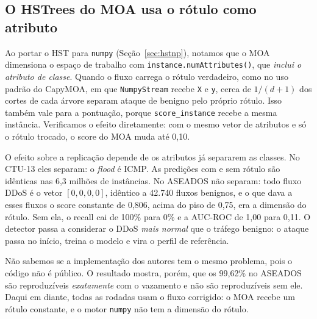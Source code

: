 \subsection{O HSTrees do MOA usa o rótulo como atributo}
\label{sec:leak}
Ao portar o HST para \texttt{numpy} (Seção~\ref{sec:hstnp}), notamos que o MOA dimensiona o espaço de
trabalho com \texttt{instance.numAttributes()}, que \emph{inclui o atributo de classe}. Quando o fluxo
carrega o rótulo verdadeiro, como no uso padrão do CapyMOA, em que \texttt{NumpyStream} recebe
\texttt{X} e \texttt{y}, cerca de $1/(d+1)$ dos cortes de cada árvore separam ataque de benigno pelo
próprio rótulo. Isso também vale para a pontuação, porque \texttt{score\_instance} recebe a mesma
instância. Verificamos o efeito diretamente: com o mesmo vetor de atributos e só o rótulo trocado,
o score do MOA muda até 0,10.

O efeito sobre a replicação depende de os atributos já separarem as classes. No CTU-13 eles
separam: o \emph{flood} é ICMP. As predições com e sem rótulo são idênticas nas 6,3 milhões de
instâncias. No ASEADOS não separam: todo fluxo DDoS é o vetor $[0,0,0,0]$, idêntico a 42.740 fluxos
benignos, e o que dava a esses fluxos o score constante de 0,806, acima do piso de 0,75, era a
dimensão do rótulo. Sem ela, o recall cai de 100\% para 0\% e a AUC-ROC de 1,00 para 0,11. O
detector passa a considerar o DDoS \emph{mais normal} que o tráfego benigno: o ataque passa no
início, treina o modelo e vira o perfil de referência.

Não sabemos se a implementação dos autores tem o mesmo problema, pois o código não é público. O
resultado mostra, porém, que os 99,62\% no
ASEADOS são reproduzíveis \emph{exatamente} com o vazamento e não são reproduzíveis sem ele. Daqui
em diante, todas as rodadas usam o fluxo corrigido: o MOA recebe um rótulo constante, e o motor
\texttt{numpy} não tem a dimensão do rótulo.
